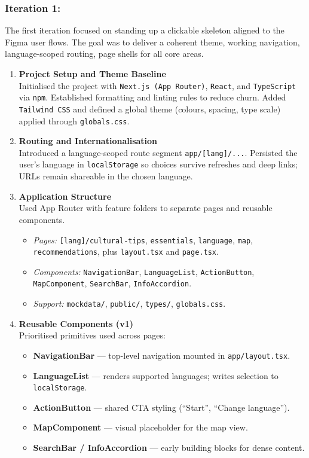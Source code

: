 \subsubsection{Iteration 1:}
The first iteration focused on standing up a clickable skeleton aligned to the Figma user flows. The goal was to deliver a coherent theme, working navigation, language-scoped routing, page shells for all core areas.

\begin{enumerate}
    \item \textbf{Project Setup and Theme Baseline} \\
    Initialised the project with \texttt{Next.js (App Router)}, \texttt{React}, and \texttt{TypeScript} via \texttt{npm}. Established formatting and linting rules to reduce churn. Added \texttt{Tailwind CSS} and defined a global theme (colours, spacing, type scale) applied through \texttt{globals.css}.

    \item \textbf{Routing and Internationalisation} \\
    Introduced a language-scoped route segment \verb|app/[lang]/...|. Persisted the user’s language in \texttt{localStorage} so choices survive refreshes and deep links; URLs remain shareable in the chosen language.

    \item \textbf{Application Structure} \\
    Used App Router with feature folders to separate pages and reusable components.
    \begin{itemize}
        \item \textit{Pages:} \verb|[lang]/cultural-tips|, \verb|essentials|, \verb|language|, \verb|map|, \verb|recommendations|, plus \verb|layout.tsx| and \verb|page.tsx|.
        \item \textit{Components:} \texttt{NavigationBar}, \texttt{LanguageList}, \texttt{ActionButton}, \texttt{MapComponent}, \texttt{SearchBar}, \texttt{InfoAccordion}.
        \item \textit{Support:} \texttt{mockdata/}, \texttt{public/}, \texttt{types/}, \texttt{globals.css}.
    \end{itemize}

    \item \textbf{Reusable Components (v1)} \\
    Prioritised primitives used across pages:
    \begin{itemize}
        \item \textbf{NavigationBar} — top-level navigation mounted in \verb|app/layout.tsx|.
        \item \textbf{LanguageList} — renders supported languages; writes selection to \texttt{localStorage}.
        \item \textbf{ActionButton} — shared CTA styling (``Start'', ``Change language'').
        \item \textbf{MapComponent} — visual placeholder for the map view.
        \item \textbf{SearchBar / InfoAccordion} — early building blocks for dense content.
    \end{itemize}


\end{enumerate}
